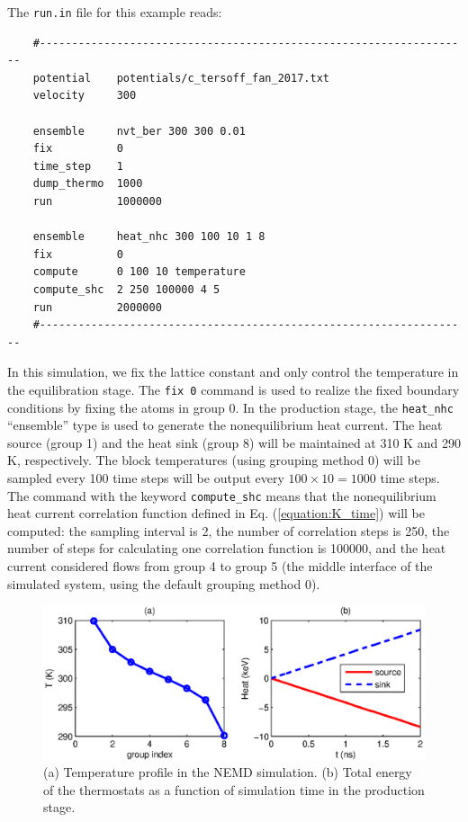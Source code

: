 \documentclass[12pt,a4paper]{report}
\begin{document}
The \verb"run.in" file for this example reads:
\begin{verbatim}
    #-------------------------------------------------------------------
    potential    potentials/c_tersoff_fan_2017.txt
    velocity     300

    ensemble     nvt_ber 300 300 0.01
    fix          0
    time_step    1
    dump_thermo  1000
    run          1000000

    ensemble     heat_nhc 300 100 10 1 8
    fix          0
    compute      0 100 10 temperature
    compute_shc  2 250 100000 4 5
    run          2000000
    #-------------------------------------------------------------------
\end{verbatim}

In this simulation, we fix the lattice constant and only control the temperature in the equilibration stage. The \verb"fix 0" command is used to realize the fixed boundary conditions by fixing the atoms in group 0. In the production stage, the \verb"heat_nhc" ``ensemble'' type is used to generate the nonequilibrium heat current.  The heat source (group 1) and the heat sink (group 8) will be maintained at 310 K and 290 K, respectively. The block temperatures (using grouping method 0) will be sampled every 100 time steps will be output every $100\times 10=1000$ time steps. The command with the keyword \verb"compute_shc" means that the nonequilibrium heat current correlation function defined in Eq. (\ref{equation:K_time}) will be computed: the sampling interval is 2, the number of correlation steps is 250, the number of steps for calculating one correlation function is 100000, and the heat current considered flows from group 4 to group 5 (the middle interface of the simulated system, using the default grouping method 0).


\begin{figure}[ht]
\begin{center}
\includegraphics[width=\columnwidth]{ex4a.eps}
\caption{(a) Temperature profile in the NEMD simulation. (b) Total energy of the thermostats as a function of simulation time in the production stage. }
\label{figure:ex4a}
\end{center}
\end{figure}
\end{document}

